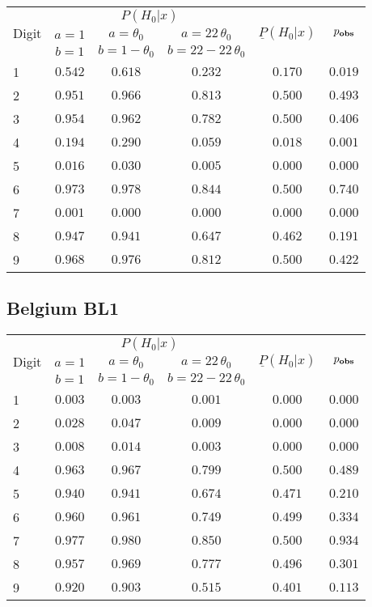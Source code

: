 \documentclass[12pt,a4paper,draft]{article}
\begin{document}
\begin{table}[H] 
\begin{center}
\begin{tabular}{|l|c|c|c|c|c|}

\hline
\multicolumn{1}{|c|}{\multirow{3}{*}{Digit}} & \multicolumn{3}{c|}{$P{(H_0|{x})}$} &  \multicolumn{1}{c|}{\multirow{3}{*}{${\underline{P}}{(H_0|{x})}$}} & \multicolumn{1}{c|}{\multirow{3}{*}{${p_{\text{\textbf{obs}}}}$}} \tabularnewline
\cline{2-4}
&\multicolumn{1}{c|}{$a=1$}&\multicolumn{1}{c|}{$a = \theta_0$}&\multicolumn{1}{c|}{$a = 22 \, \theta_0$}& & \\
&\multicolumn{1}{c|}{$b=1$}&\multicolumn{1}{c|}{$b = 1-\theta_0$}&\multicolumn{1}{c|}{$b = 22-22 \, \theta_0$}& &\\
\hline

1&$0.542$&$0.618$&$0.232$&$0.170$&$0.019$\tabularnewline
2&$0.951$&$0.966$&$0.813$&$0.500$&$0.493$\tabularnewline
3&$0.954$&$0.962$&$0.782$&$0.500$&$0.406$\tabularnewline
4&$0.194$&$0.290$&$0.059$&$0.018$&$0.001$\tabularnewline
5&$0.016$&$0.030$&$0.005$&$0.000$&$0.000$\tabularnewline
6&$0.973$&$0.978$&$0.844$&$0.500$&$0.740$\tabularnewline
7&$0.001$&$0.000$&$0.000$&$0.000$&$0.000$\tabularnewline
8&$0.947$&$0.941$&$0.647$&$0.462$&$0.191$\tabularnewline
9&$0.968$&$0.976$&$0.812$&$0.500$&$0.422$\tabularnewline
\hline
\end{tabular}\end{center}
\end{table}

\subsection{Belgium BL1}

\begin{table}[H] 
\begin{center}
\begin{tabular}{|l|c|c|c|c|c|}

\hline
\multicolumn{1}{|c|}{\multirow{3}{*}{Digit}} & \multicolumn{3}{c|}{$P{(H_0|{x})}$} &  \multicolumn{1}{c|}{\multirow{3}{*}{${\underline{P}}{(H_0|{x})}$}} & \multicolumn{1}{c|}{\multirow{3}{*}{${p_{\text{\textbf{obs}}}}$}} \tabularnewline
\cline{2-4}
&\multicolumn{1}{c|}{$a=1$}&\multicolumn{1}{c|}{$a = \theta_0$}&\multicolumn{1}{c|}{$a = 22 \, \theta_0$}& & \\
&\multicolumn{1}{c|}{$b=1$}&\multicolumn{1}{c|}{$b = 1-\theta_0$}&\multicolumn{1}{c|}{$b = 22-22 \, \theta_0$}& &\\
\hline

1&$0.003$&$0.003$&$0.001$&$0.000$&$0.000$\tabularnewline
2&$0.028$&$0.047$&$0.009$&$0.000$&$0.000$\tabularnewline
3&$0.008$&$0.014$&$0.003$&$0.000$&$0.000$\tabularnewline
4&$0.963$&$0.967$&$0.799$&$0.500$&$0.489$\tabularnewline
5&$0.940$&$0.941$&$0.674$&$0.471$&$0.210$\tabularnewline
6&$0.960$&$0.961$&$0.749$&$0.499$&$0.334$\tabularnewline
7&$0.977$&$0.980$&$0.850$&$0.500$&$0.934$\tabularnewline
8&$0.957$&$0.969$&$0.777$&$0.496$&$0.301$\tabularnewline
9&$0.920$&$0.903$&$0.515$&$0.401$&$0.113$\tabularnewline
\hline
\end{tabular}\end{center}
\end{table}
\end{document}
